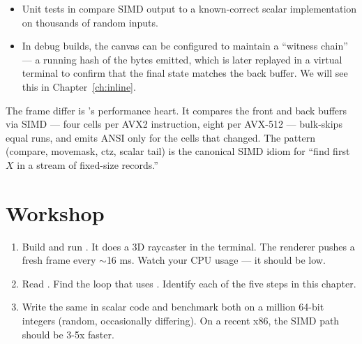 \begin{itemize}[leftmargin=*]
  \item Unit tests in  compare
    SIMD output to a known-correct scalar implementation on
    thousands of random inputs.
  \item In debug builds, the canvas can be configured to maintain a
    ``witness chain'' --- a running hash of the bytes emitted, which
    is later replayed in a virtual terminal to confirm that the
    final state matches the back buffer. We will see this in
    Chapter~\ref{ch:inline}.
\end{itemize}

\begin{recap}
The frame differ is \maya{}'s performance heart. It compares the
front and back buffers via SIMD --- four cells per AVX2 instruction,
eight per AVX-512 --- bulk-skips equal runs, and emits ANSI only for
the cells that changed. The pattern (compare, movemask, ctz, scalar
tail) is the canonical SIMD idiom for ``find first $X$ in a stream
of fixed-size records.''
\end{recap}

\section*{Workshop}

\begin{enumerate}[leftmargin=*]
  \item Build and run . It does a 3D
    raycaster in the terminal. The renderer pushes a fresh frame
    every $\sim$16 ms. Watch your CPU usage --- it should be low.
  \item Read . Find
    the loop that uses . Identify each
    of the five steps in this chapter.
  \item Write the same  in scalar code and
    benchmark both on a million 64-bit integers (random,
    occasionally differing). On a recent x86, the SIMD path should
    be 3-5x faster.
\end{enumerate}
